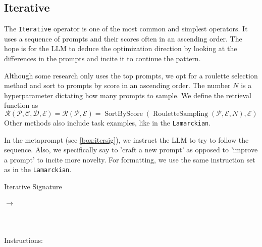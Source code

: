 \subsection{Iterative}
The \texttt{Iterative} operator is one of the most common and simplest operators. 
It uses a sequence of prompts and their scores often in an ascending order.
The hope is for the LLM to deduce the optimization direction by looking at the differences in the prompts and incite it to continue the pattern.

Although some research\cite{yang2024largelanguagemodelsoptimizers} only uses the top prompts, we opt for a roulette selection method
and sort to prompts by score in an ascending order. The number $N$ is a hyperparameter dictating how many prompts to sample.
We define the retrieval function as
\begin{equation}
    \mathcal{R}(\mathcal{P}, \mathcal{C}, \mathcal{D}, \mathcal{E}) = \mathcal{R}(\mathcal{P}, \mathcal{E}) = \operatorname{SortByScore}(\operatorname{RouletteSampling}(\mathcal{P}, \mathcal{E}, N), \mathcal{E})
\end{equation}
Other methods\cite{tang2024unleashingpotentiallargelanguage} also include task examples, like in the \texttt{Lamarckian}.

In the metaprompt (see \ref{box:itersig}), we instruct the LLM to try to follow the sequence. Also, we specifically say to 'craft a new prompt'
as opposed to 'improve a prompt' to incite more novelty. For formatting, we use the same instruction set as in the \texttt{Lamarckian}.

\begin{promptbox}[label={box:itersig}]{Iterative Signature}
    \\\\
    $\rightarrow$ \\\\
     \hfill
    \\ \\
    Instructions:
\end{promptbox}

